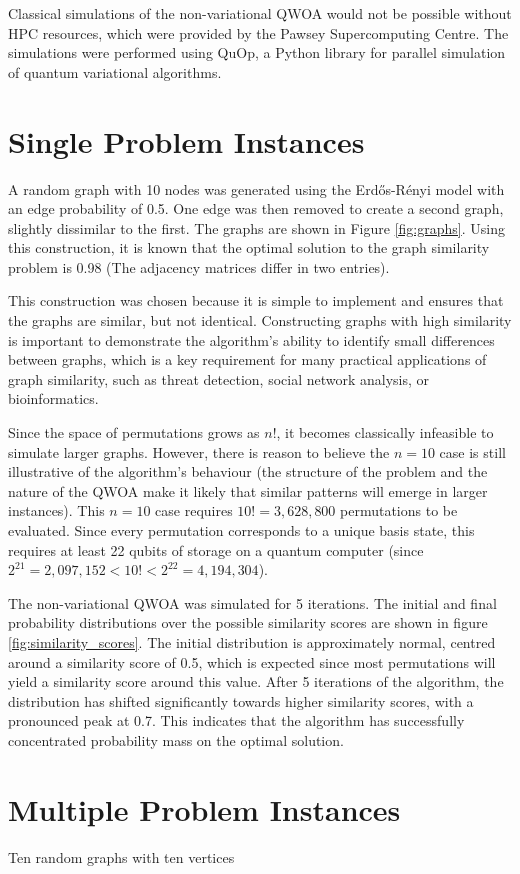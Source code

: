 Classical simulations of the non-variational QWOA would not be possible without HPC resources, which were provided by the Pawsey Supercomputing Centre. The simulations were performed using QuOp, a Python library for parallel simulation of quantum variational algorithms. \cite{QuOp_MPI_paper_variational,QuOp_MPI}

\section{Single Problem Instances}

A random graph with 10 nodes was generated using the Erdős-Rényi model with an edge probability of 0.5. One edge was then removed to create a second graph, slightly dissimilar to the first. The graphs are shown in Figure \ref{fig:graphs}. Using this construction, it is known that the optimal solution to the graph similarity problem is 0.98 (The adjacency matrices differ in two entries).

This construction was chosen because it is simple to implement and ensures that the graphs are similar, but not identical. Constructing graphs with high similarity is important to demonstrate the algorithm's ability to identify small differences between graphs, which is a key requirement for many practical applications of graph similarity, such as threat detection, social network analysis, or bioinformatics.

Since the space of permutations grows as $n!$, it becomes classically infeasible to simulate larger graphs. However, there is reason to believe the $n=10$ case is still illustrative of the algorithm's behaviour (the structure of the problem and the nature of the QWOA make it likely that similar patterns will emerge in larger instances). This $n=10$ case requires $10!=3,628,800$ permutations to be evaluated. Since every permutation corresponds to a unique basis state, this requires at least 22 qubits of storage on a quantum computer (since $2^{21} = 2,097,152 < 10! < 2^{22} = 4,194,304$).

The non-variational QWOA was simulated for 5 iterations. The initial and final probability distributions over the possible similarity scores are shown in figure \ref{fig:similarity_scores}. The initial distribution is approximately normal, centred around a similarity score of 0.5, which is expected since most permutations will yield a similarity score around this value. After 5 iterations of the algorithm, the distribution has shifted significantly towards higher similarity scores, with a pronounced peak at 0.7. This indicates that the algorithm has successfully concentrated probability mass on the optimal solution.



\section{Multiple Problem Instances}

Ten random graphs with ten vertices 